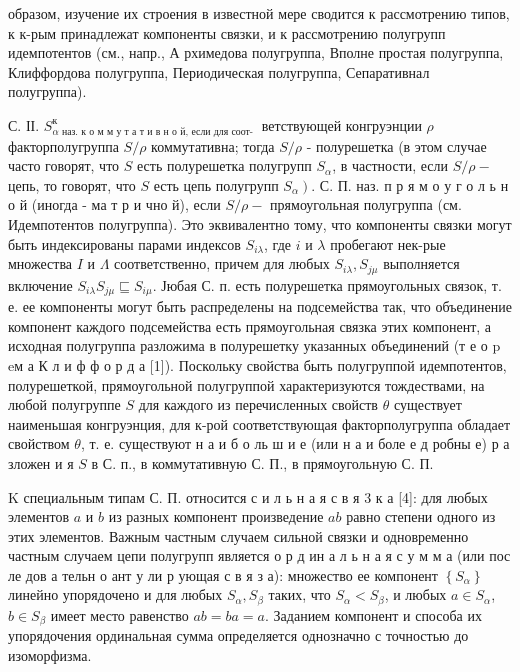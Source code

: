 \documentclass[10pt]{article}
\begin{document}
образом, изучение их строения в известной мере сводится к рассмотрению типов, к к-рым принадлежат компоненты связки, и к рассмотрению полугрупп идемпотентов (см., напр., А рхимедова полугруппа, Вполне простая полугруппа, Клиффордова полугруппа, Периодическая полугруппа, Сепаративнал полугруппа).



С. ІІ. $S_{\alpha \text { наз. к о м м у т а т и в н о й, если для соот- }}^{\text {к }}$ ветствующей конгруэнции $\rho$ факторполугруппа $S / \rho$ коммутативна; тогда $S / \rho$ - полурешетка (в этом случае часто говорят, что $S$ есть полурешетка полугрупп $S_{\alpha}$, в частности, если $S / \rho-$ цепь, то говорят, что $S$ есть цепь полугрупп $\left.S_{\alpha}\right)$. С. П. наз. п р я м о у г о л ь н о й (иногда - ма т р и чно й), если $S / \rho-$ прямоугольная полугруппа (см. Идемпотентов полугруппа). Это эквивалентно тому, что компоненты связки могут быть индексированы парами индексов $S_{i \lambda}$, где $i$ и $\lambda$ пробегают нек-рые множества $I$ и $\Lambda$ соответственно, причем для любых $S_{i \lambda}, S_{j \mu}$ выполняется включение $S_{i \lambda} S_{j \mu} \sqsubseteq S_{i \mu}$. Јюбая С. п. есть полурешетка прямоугольных связок, т. е. ее компоненты могут быть распределены на подсемейства так, что объединение компонент каждого подсемейства есть прямоугольная связка этих компонент, а исходная полугруппа разложима в полурешетку указанных объединений (т е о p eм а К л и ф ф о р д а [1]). Поскольку свойства быть полугруппой идемпотентов, полурешеткой, прямоугольной полугруппой характеризуются тождествами, на любой полугруппе $S$ для каждого из перечисленных свойств $\theta$ существует наименьшая конгруэнция, для к-рой соответствующая факторполугруппа обладает свойством $\theta$, т. е. существуют н а и б о ль ш и е (или н а и боле е д робны е) р а зложен и я $S$ в С. п., в коммутативную С. П., в прямоугольную С. П.



K специальным типам С. П. относится с и л ь н а я с в я 3 к а [4]: для любых элементов $a$ и $b$ из разных компонент произведение $a b$ равно степени одного из этих элементов. Важным частным случаем сильной связки и одновременно частным случаем цепи полугрупп является о р д ин а л ь н а я с у м м а (или пос ле дов а тельн о ант у ли р ующая с в я з а): множество ее компонент $\left\{S_{\alpha}\right\}$ линейно упорядочено и для любых $S_{\alpha}, S_{\beta}$ таких, что $S_{\alpha}<S_{\beta}$, и любых $a \in S_{\alpha}$, $b \in S_{\beta}$ имеет место равенство $a b=b a=a$. Заданием компонент и способа их упорядочения ординальная сумма определяется однозначно с точностью до изоморфизма.
\end{document}

